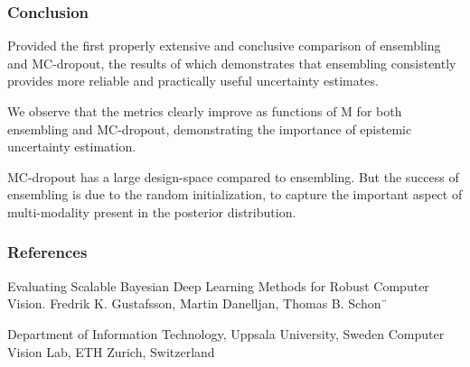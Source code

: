 \documentclass{beamer}
\begin{document}
\begin{frame}
\frametitle{Conclusion}

\hspace{0.3cm} Provided the first properly extensive and conclusive comparison of ensembling and MC-dropout, the results of which demonstrates that ensembling consistently provides more reliable and practically useful uncertainty estimates.

\vspace{0.3cm} 

\hspace{0.3cm} We observe that the metrics clearly improve as functions of M for both ensembling and MC-dropout, demonstrating the importance of epistemic uncertainty estimation.

\vspace{0.3cm} 

\hspace{0.3cm} MC-dropout has a large design-space compared to ensembling. But the success of ensembling is due to the random initialization, to capture the important aspect of multi-modality present in the posterior distribution.

\end{frame}



\begin{frame}
\frametitle{References}

Evaluating Scalable Bayesian Deep Learning
Methods for Robust Computer Vision. Fredrik K. Gustafsson, Martin Danelljan, Thomas B. Schon¨


Department of Information Technology, Uppsala University, Sweden Computer Vision Lab, ETH Zurich, Switzerland

\end{frame}
\end{document}
